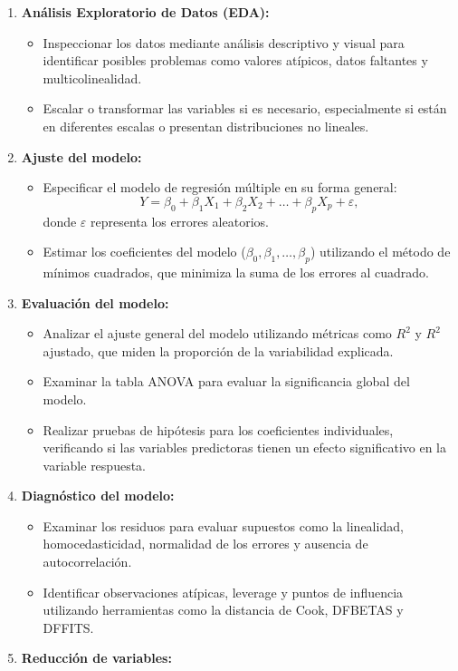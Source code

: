 \documentclass[
  letterpaper,
  DIV=11,
  numbers=noendperiod]{scrreprt}
\providecommand{\tightlist}{%
  \setlength{\itemsep}{0pt}\setlength{\parskip}{0pt}}
\begin{document}
\begin{enumerate}
\def\labelenumi{\arabic{enumi}.}
\setcounter{enumi}{2}
\tightlist
\item
  \textbf{Análisis Exploratorio de Datos (EDA):}

  \begin{itemize}
  \tightlist
  \item
    Inspeccionar los datos mediante análisis descriptivo y visual para
    identificar posibles problemas como valores atípicos, datos
    faltantes y multicolinealidad.
  \item
    Escalar o transformar las variables si es necesario, especialmente
    si están en diferentes escalas o presentan distribuciones no
    lineales.
  \end{itemize}
\item
  \textbf{Ajuste del modelo:}

  \begin{itemize}
  \tightlist
  \item
    Especificar el modelo de regresión múltiple en su forma general:\\
    \[
    Y = \beta_0 + \beta_1X_1 + \beta_2X_2 + \dots + \beta_pX_p + \varepsilon,
     \] donde \(\varepsilon\) representa los errores aleatorios.
  \item
    Estimar los coeficientes del modelo
    (\(\beta_0, \beta_1, \dots, \beta_p\)) utilizando el método de
    mínimos cuadrados, que minimiza la suma de los errores al cuadrado.
  \end{itemize}
\item
  \textbf{Evaluación del modelo:}

  \begin{itemize}
  \tightlist
  \item
    Analizar el ajuste general del modelo utilizando métricas como
    \(R^2\) y \(R^2\) ajustado, que miden la proporción de la
    variabilidad explicada.
  \item
    Examinar la tabla ANOVA para evaluar la significancia global del
    modelo.
  \item
    Realizar pruebas de hipótesis para los coeficientes individuales,
    verificando si las variables predictoras tienen un efecto
    significativo en la variable respuesta.
  \end{itemize}
\item
  \textbf{Diagnóstico del modelo:}

  \begin{itemize}
  \tightlist
  \item
    Examinar los residuos para evaluar supuestos como la linealidad,
    homocedasticidad, normalidad de los errores y ausencia de
    autocorrelación.
  \item
    Identificar observaciones atípicas, leverage y puntos de influencia
    utilizando herramientas como la distancia de Cook, DFBETAS y DFFITS.
  \end{itemize}
\item
  \textbf{Reducción de variables:}


\end{enumerate}
\end{document}
